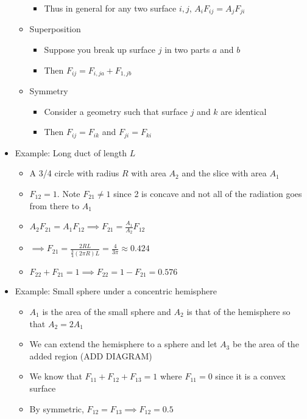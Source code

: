 \documentclass[12pt]{article}
\begin{document}
\begin{itemize}
\begin{itemize}
\begin{itemize}
            \item Thus in general for any two surface $i, j$, $A_i F_{ij} = A_j F_{ji}$
        \end{itemize}
        \item Superposition \begin{itemize}
            \item Suppose you break up surface $j$ in two parts $a$ and $b$
            \item Then $F_{ij} = F_{i, ja} + F_{1, jb}$
        \end{itemize}
        \item Symmetry \begin{itemize}
            \item Consider a geometry such that surface $j$ and $k$ are identical 
            \item Then $F_{ij} = F_{ik}$ and $F_{ji} = F_{ki}$
        \end{itemize}
    \end{itemize}
    \item Example: Long duct of length $L$ \begin{itemize}
        \item A 3/4 circle with radius $R$ with area $A_2$ and the slice with area $A_1$
        \item $F_{12} = 1$. Note $F_{21} \neq 1$ since 2 is concave and not all of the radiation goes from there to $A_1$
        \item $A_2 F_{21} = A_1 F_{12} \implies F_{21} = \frac{A_1}{A_2} F_{12}$
        \item $\implies F_{21} = \frac{2R L}{\frac{3}{4} (2 \pi R) L} = \frac{4}{3 \pi} \approx 0.424$
        \item $F_{22} + F_{21}  = 1 \implies F_{22} = 1 - F_{21} = 0.576$
    \end{itemize}
    \item Example: Small sphere under a concentric hemisphere \begin{itemize}
        \item $A_1$ is the area of the small sphere and $A_2$ is that of the hemisphere so that $A_2 = 2A_1$
        \item We can extend the hemisphere to a sphere and let $A_3$ be the area of the added region (ADD DIAGRAM)
        \item We know that $F_{11} + F_{12} + F_{13} = 1$ where $F_{11} = 0$ since it is a convex surface 
        \item By symmetric, $F_{12} = F_{13} \implies F_{12} = 0.5$

\end{itemize}
\end{itemize}
\end{document}
